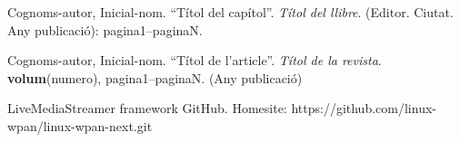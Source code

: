 \documentclass[english,final]{setup/eetac_tfc_pfc}
\begin{document}
%         












%





%  

\cleardoublepage
{}
\begin{thebibliography}{2}


Cognoms-autor, Inicial-nom.
``Títol del capítol''. {\it Títol del llibre}.
(Editor. Ciutat. Any publicació): pagina1--paginaN.

Cognoms-autor, Inicial-nom.
``Títol de l'article''. {\it Títol de la revista}.
{\bf volum}(numero),
pagina1--paginaN. (Any publicació) 

LiveMediaStreamer framework GitHub. Homesite: https://github.com/linux-wpan/linux-wpan-next.git

\end{thebibliography}
\end{document}
